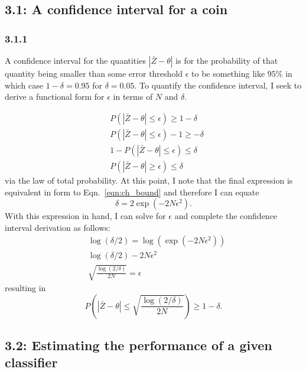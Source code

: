 \documentclass[12pt]{amsart}
\begin{document}
\subsection*{3.1: A confidence interval for a coin}

\subsubsection*{3.1.1}

A confidence interval for the quantities $|\bar{Z} - \theta|$ is for the probability of that quantity being smaller than some error threshold $\epsilon$ to be something like $95\%$ in which case $1 - \delta = 0.95$ for $\delta = 0.05$.  To quantify the confidence interval, I seek to derive a functional form for $\epsilon$ in terms of $N$ and $\delta$.

\begin{equation}
\begin{split}
& P(|\bar{Z} - \theta| \leq \epsilon) \geq 1 - \delta \\
& P(|\bar{Z} - \theta| \leq \epsilon) - 1 \geq - \delta \\
& 1- P(|\bar{Z} - \theta| \leq \epsilon) \leq \delta \\
& P(|\bar{Z} - \theta| \geq \epsilon) \leq \delta
\end{split}
\end{equation}
via the law of total probability.  At this point, I note that the final expression is equivalent in form to Eqn.~\ref{eqn:ch_bound} and therefore I can equate
\begin{equation}
\delta = 2 \exp(-2N \epsilon^2).
\end{equation}
With this expression in hand, I can solve for $\epsilon$ and complete the confidence interval derivation as follows:
\begin{equation} \label{eqn:eps_bound}
\begin{split}
& \log (\delta/2) = \log(\exp(-2N \epsilon^2)) \\
& \log(\delta/2) -2N \epsilon^2 \\
& \sqrt{\frac{\log(2/\delta)}{2N}} = \epsilon
\end{split}
\end{equation}
resulting in
\begin{equation}
P(|\bar{Z} - \theta| \leq \sqrt{\frac{\log(2/\delta)}{2N}}) \geq 1 - \delta.
\end{equation}

\subsection*{3.2: Estimating the performance of a given classifier}
\end{document}
